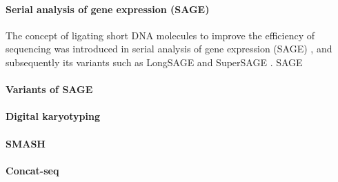 \paragraph{Serial analysis of gene expression (SAGE)}
The concept of ligating short DNA molecules to improve the efficiency
of sequencing was introduced in serial analysis of gene expression
(SAGE) \citep{}, and subsequently its variants such as LongSAGE and
SuperSAGE \citep{}. SAGE

\paragraph{Variants of SAGE}

\paragraph{Digital karyotyping}

\paragraph{SMASH}

\paragraph{Concat-seq}

